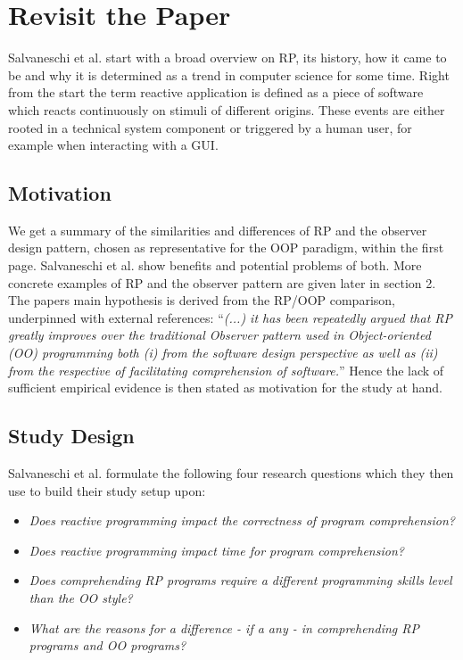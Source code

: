 \documentclass[12pt,a4paper]{article}
\begin{document}
\section{Revisit the Paper}

Salvaneschi et al. start with a broad overview on RP, its history, how it came to be and why it is determined as a trend in computer science for some time. Right from the start the term reactive application is defined as a piece of software which reacts continuously on stimuli of different origins. These events are either rooted in a technical system component or triggered by a human user, for example when interacting with a GUI.

\subsection{Motivation}
We get a summary of the similarities and differences of RP and the observer design pattern, chosen as representative for the OOP paradigm, within the first page. Salvaneschi et al. show benefits and potential problems of both. More concrete examples of RP and the observer pattern are given later in section 2. The papers main hypothesis is derived from the RP/OOP comparison, underpinned with external references: ``\emph{(...) it has been repeatedly argued that RP greatly improves over the traditional Observer pattern used in Object-oriented (OO) programming both (i) from the software design perspective as well as (ii) from the respective of facilitating comprehension of software.}'' Hence the lack of sufficient empirical evidence is then stated as motivation for the study at hand.

\subsection{Study Design}
Salvaneschi et al. formulate the following four research questions which they then use to build their study setup upon:

\begin{itemize}
	\item \emph{Does reactive programming impact the correctness of program comprehension?}
	\item \emph{Does reactive programming impact time for program comprehension?}
	\item \emph{Does comprehending RP programs require a different programming skills level than the OO style?}
	\item \emph{What are the reasons for a difference - if a any - in comprehending RP programs and OO programs?}
\end{itemize}
\end{document}
